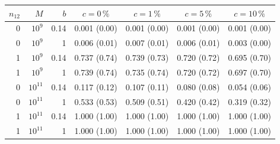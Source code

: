 \begin{tabular}{rrrcccc}
\toprule
$n_{12}$ & $M$ & $b$ & $c=0\,\%$ & $c=1\,\%$ & $c=5\,\%$ & $c=10\,\%$ \\
\midrule
0 & $10^{9}$ & 0.14 & 0.001 (0.00) & 0.001 (0.00) & 0.001 (0.00) & 0.001 (0.00) \\
0 & $10^{9}$ & 1 & 0.006 (0.01) & 0.007 (0.01) & 0.006 (0.01) & 0.003 (0.00) \\
1 & $10^{9}$ & 0.14 & 0.737 (0.74) & 0.739 (0.73) & 0.720 (0.72) & 0.695 (0.70) \\
1 & $10^{9}$ & 1 & 0.739 (0.74) & 0.735 (0.74) & 0.720 (0.72) & 0.697 (0.70) \\
0 & $10^{11}$ & 0.14 & 0.117 (0.12) & 0.107 (0.11) & 0.080 (0.08) & 0.054 (0.06) \\
0 & $10^{11}$ & 1 & 0.533 (0.53) & 0.509 (0.51) & 0.420 (0.42) & 0.319 (0.32) \\
1 & $10^{11}$ & 0.14 & 1.000 (1.00) & 1.000 (1.00) & 1.000 (1.00) & 1.000 (1.00) \\
1 & $10^{11}$ & 1 & 1.000 (1.00) & 1.000 (1.00) & 1.000 (1.00) & 1.000 (1.00) \\
\bottomrule
\end{tabular}
